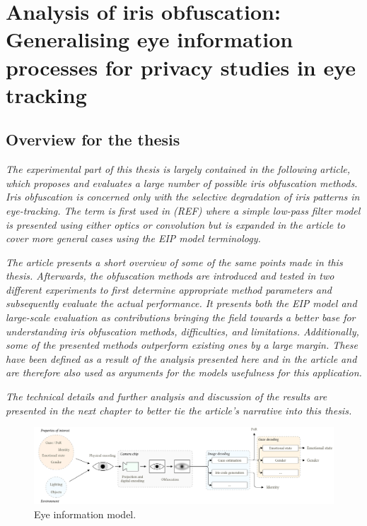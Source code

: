 \chapter{Analysis of iris obfuscation: Generalising eye information processes for privacy studies in eye tracking}

\section*{Overview for the thesis}

\emph{
The experimental part of this thesis is largely contained in the following article, which proposes and evaluates a large number of possible iris obfuscation methods. Iris obfuscation is concerned only with the selective degradation of iris patterns in eye-tracking. The term is first used in (REF) where a simple low-pass filter model is presented using either optics or convolution but is expanded in the article to cover more general cases using the EIP model terminology. }

\emph{The article presents a short overview of some of the same points made in this thesis. Afterwards, the obfuscation methods are introduced and tested in two different experiments to first determine appropriate method parameters and subsequently evaluate the actual performance. It presents both the EIP model and large-scale evaluation as contributions bringing the field towards a better base for understanding iris obfuscation methods, difficulties, and limitations. Additionally, some of the presented methods outperform existing ones by a large margin. These have been defined as a result of the analysis presented here and in the article and are therefore also used as arguments for the models usefulness for this application.}

\emph{The technical details and further analysis and discussion of the results are presented in the next chapter to better tie the article's narrative into this thesis.}


\begin{figure}[b]
    \centering
    \includegraphics[width=1\textwidth]{figures/Model.pdf}
    \caption{Eye information model.}
    \label{fig:overview}
\end{figure}








% 


